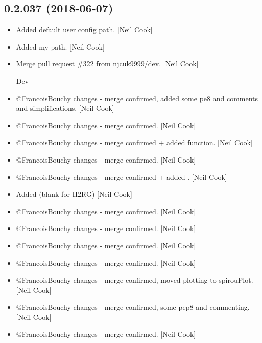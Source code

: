 \documentclass[a4paper,10pt,english]{report}
\begin{document}
\subsection{0.2.037 (2018-06-07)}
\label{\detokenize{misc/changelog:id427}}\begin{itemize}
\item {} 
Added default user config path. {[}Neil Cook{]}

\item {} 
Added my path. {[}Neil Cook{]}

\item {} 
Merge pull request \#322 from njcuk9999/dev. {[}Neil Cook{]}

Dev

\item {} 
@FrancoisBouchy changes - merge confirmed, added some pe8 and comments
and simplifications. {[}Neil Cook{]}

\item {} 
@FrancoisBouchy changes - merge confirmed. {[}Neil Cook{]}

\item {} 
@FrancoisBouchy changes - merge confirmed + added 
function. {[}Neil Cook{]}

\item {} 
@FrancoisBouchy changes - merge confirmed. {[}Neil Cook{]}

\item {} 
@FrancoisBouchy changes - merge confirmed + added
. {[}Neil Cook{]}

\item {} 
Added  (blank for H2RG) {[}Neil Cook{]}

\item {} 
@FrancoisBouchy changes - merge confirmed. {[}Neil Cook{]}

\item {} 
@FrancoisBouchy changes - merge confirmed. {[}Neil Cook{]}

\item {} 
@FrancoisBouchy changes - merge confirmed. {[}Neil Cook{]}

\item {} 
@FrancoisBouchy changes - merge confirmed. {[}Neil Cook{]}

\item {} 
@FrancoisBouchy changes - merge confirmed, moved plotting to
spirouPlot. {[}Neil Cook{]}

\item {} 
@FrancoisBouchy changes - merge confirmed, some pep8 and commenting.
{[}Neil Cook{]}

\item {} 
@FrancoisBouchy changes - merge confirmed. {[}Neil Cook{]}

\end{itemize}
\end{document}
